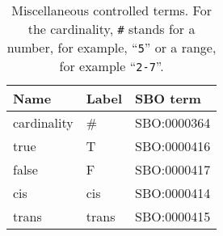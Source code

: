 \begin{table}[h]
  \centering
  \begin{tabular}{l>{\ttfamily}l>{\ttfamily}l}
    \toprule
    \textbf{Name}   & \textbf{\rmfamily Label} & \textbf{\rmfamily SBO term} \\
    \midrule
    cardinality    & \#  & SBO:0000364\\
    true           & T     & SBO:0000416\\
    false          & F     & SBO:0000417\\
    cis            & cis   & SBO:0000414\\
    trans          & trans & SBO:0000415\\
    \bottomrule
  \end{tabular}
  \caption{Miscellaneous controlled terms. For the cardinality, \texttt{\#} stands for a
    number, for example, ``\texttt{5}'' or a range, for example ``\texttt{2-7}''.}
  \label{tab:cardinality-cv}
\end{table}

